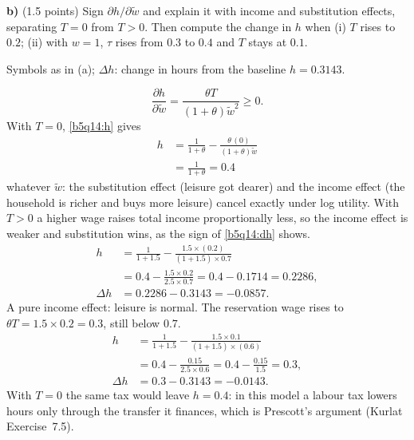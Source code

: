 \textbf{b)} (1.5 points) Sign $\partial h/\partial\tilde w$ and explain it with income and substitution effects, separating $T=0$ from $T>0$. Then
compute the change in $h$ when (i) $T$ rises to $0.2$; (ii) with $w=1$, $\tau$ rises from $0.3$ to $0.4$ and $T$ stays at $0.1$.
\resolespaco
\begin{sol}
\begin{notacao}
\item Symbols as in (a); $\Delta h$: change in hours from the baseline $h=0.3143$.
\end{notacao}
\begin{equation}
\frac{\partial h}{\partial\tilde w}=\frac{\theta T}{(1+\theta)\tilde w^2}\ge0. \label{b5q14:dh}
\end{equation}
With $T=0$, \eqref{b5q14:h} gives
\begin{align*}
h&=\frac1{1+\theta}-\frac{\theta\,(0)}{(1+\theta)\tilde w}\\
&=\frac1{1+\theta}=0.4
\end{align*}
whatever $\tilde w$: the substitution effect (leisure got dearer) and the income
effect (the household is richer and buys more leisure) cancel exactly under log utility. With $T>0$ a higher wage raises total income
proportionally less, so the income effect is weaker and substitution wins, as the sign of \eqref{b5q14:dh} shows.
\begin{align*}
h&=\frac1{1+1.5}-\frac{1.5\times(0.2)}{(1+1.5)\times0.7}\\
&=0.4-\frac{1.5\times0.2}{2.5\times0.7}=0.4-0.1714=0.2286,\\
\Delta h&=0.2286-0.3143=-0.0857 .
\end{align*}
A pure income effect: leisure is normal. The reservation wage rises to $\theta T=1.5\times0.2=0.3$, still below $0.7$.
\begin{align*}
h&=\frac1{1+1.5}-\frac{1.5\times0.1}{(1+1.5)\times(0.6)}\\
&=0.4-\frac{0.15}{2.5\times0.6}=0.4-\frac{0.15}{1.5}=0.3,\\
\Delta h&=0.3-0.3143=-0.0143 .
\end{align*}
With $T=0$ the same tax would leave $h=0.4$: in this model a labour tax lowers hours only through the transfer it finances, which is
Prescott's argument (Kurlat Exercise~7.5).
\end{sol}

